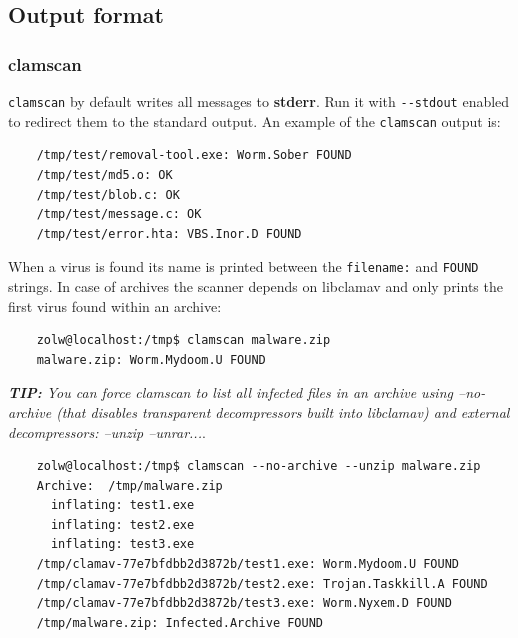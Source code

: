\documentclass[a4paper,titlepage,12pt]{article}
\begin{document}
    \subsection{Output format}

    \subsubsection{clamscan}
    \verb+clamscan+ by default writes all messages to \textbf{stderr}.
    Run it with \verb+--stdout+ enabled to redirect them to the standard
    output. An example of the \verb+clamscan+ output is:
    \begin{verbatim}
	/tmp/test/removal-tool.exe: Worm.Sober FOUND
	/tmp/test/md5.o: OK
	/tmp/test/blob.c: OK
	/tmp/test/message.c: OK
	/tmp/test/error.hta: VBS.Inor.D FOUND
    \end{verbatim}
    When a virus is found its name is printed between the \verb+filename:+ and
    \verb+FOUND+ strings. In case of archives the scanner depends on libclamav
    and only prints the first virus found within an archive:
    \begin{verbatim}
	zolw@localhost:/tmp$ clamscan malware.zip 
	malware.zip: Worm.Mydoom.U FOUND
    \end{verbatim}
    \emph{\textbf{TIP:} You can force clamscan to list all infected
    files in an archive using --no-archive (that disables transparent
    decompressors built into libclamav) and external decompressors: --unzip
    --unrar...}.\\[4pt]
    \begin{verbatim}
	zolw@localhost:/tmp$ clamscan --no-archive --unzip malware.zip
	Archive:  /tmp/malware.zip
	  inflating: test1.exe
	  inflating: test2.exe
	  inflating: test3.exe
	/tmp/clamav-77e7bfdbb2d3872b/test1.exe: Worm.Mydoom.U FOUND
	/tmp/clamav-77e7bfdbb2d3872b/test2.exe: Trojan.Taskkill.A FOUND
	/tmp/clamav-77e7bfdbb2d3872b/test3.exe: Worm.Nyxem.D FOUND
	/tmp/malware.zip: Infected.Archive FOUND
    \end{verbatim}
\end{document}
